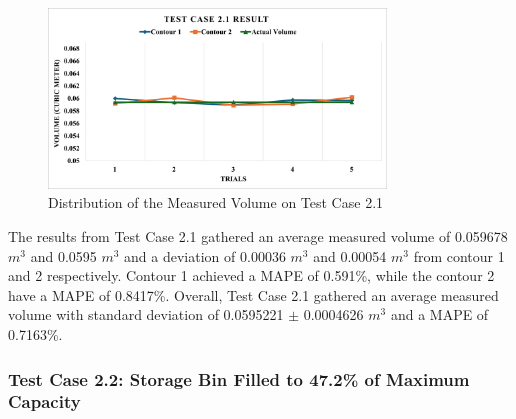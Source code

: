 \begin{figure}[H]
	\centering
	\includegraphics[width=0.8\textwidth]{Figures/test-case-2-1-graph}
	\caption{Distribution of the Measured Volume on Test Case 2.1}
	\label{ch4:fig:test-case-2-1-graph}
\end{figure}



The results from Test Case 2.1 gathered an average measured volume of 0.059678 $m^{3}$ and 0.0595 $m^{3}$ and a deviation of 0.00036 $m^{3}$ and 0.00054 $m^{3}$ from contour 1 and 2 respectively. Contour 1 achieved a MAPE of 0.591\%, while the contour 2 have a MAPE of 0.8417\%. Overall, Test Case 2.1 gathered an average measured volume with standard deviation of 0.0595221 $\pm$ 0.0004626 $m^{3}$ and a MAPE of 0.7163\%.




\subsubsection*{Test Case 2.2: Storage Bin Filled to 47.2\% of Maximum Capacity}


